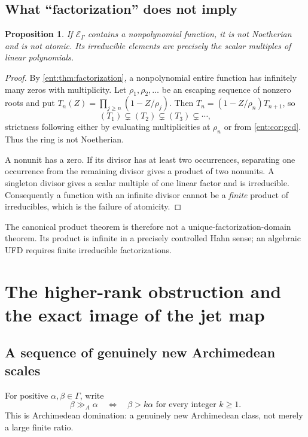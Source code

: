 \documentclass[11pt]{article}
\theoremstyle{plain}
\theoremstyle{plain}
\newtheorem{proposition}[proposition]{Proposition}
\theoremstyle{plain}
\theoremstyle{definition}
\theoremstyle{definition}
\theoremstyle{definition}
\theoremstyle{definition}
\theoremstyle{remark}
\newcommand{\E}{\mathcal E_\Gamma}
\newcommand{\ggA}{\mathrel{\gg_{\!A}}}
\begin{document}
\subsection{What ``factorization'' does not imply}
\begin{proposition}\label{ent:prop:nonnoetherian}
If $\E$ contains a nonpolynomial function, it is not Noetherian and is not
atomic. Its irreducible elements are precisely the scalar multiples of linear
polynomials.
\end{proposition}
\begin{proof}
By \cref{ent:thm:factorization}, a nonpolynomial entire function has
infinitely many zeros with multiplicity. Let $\rho_1,\rho_2,\ldots$ be an
escaping sequence of nonzero roots and put
$T_n(Z)=\prod_{j\ge n}(1-Z/\rho_j)$. Then $T_n=(1-Z/\rho_n)T_{n+1}$, so
\[
 (T_1)\subsetneq(T_2)\subsetneq(T_3)\subsetneq\cdots,
\]
strictness following either by evaluating multiplicities at $\rho_n$ or from
\cref{ent:cor:gcd}. Thus the ring is not Noetherian.

A nonunit has a zero. If its divisor has at least two occurrences, separating
one occurrence from the remaining divisor gives a product of two nonunits. A
singleton divisor gives a scalar multiple of one linear factor and is
irreducible. Consequently a function with an infinite divisor cannot be a
\emph{finite} product of irreducibles, which is the failure of atomicity.
\end{proof}

The canonical product theorem is therefore not a unique-factorization-domain
theorem. Its product is infinite in a precisely controlled Hahn sense; an
algebraic UFD requires finite irreducible factorizations.

\section{The higher-rank obstruction and the exact image of the jet map}
\label{ent:sec:obstruction}

\subsection{A sequence of genuinely new Archimedean scales}
For positive $\alpha,\beta\in\Gamma$, write
\[
 \beta\ggA\alpha
 \quad\Longleftrightarrow\quad
 \beta>k\alpha\text{ for every integer }k\ge1.
\]
This is Archimedean domination: a genuinely new Archimedean class, not merely
a large finite ratio.
\end{document}
